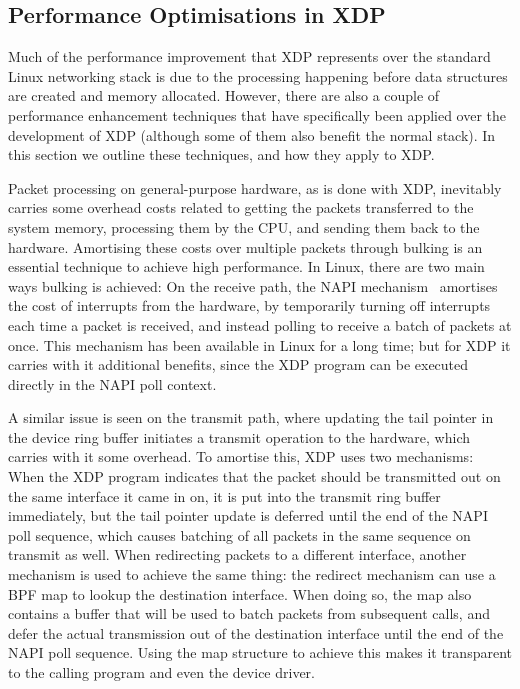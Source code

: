 \documentclass[10pt,sigconf]{acmart}
\begin{document}
\subsection{Performance Optimisations in XDP}
\label{sec:perf-optim-xdp}

Much of the performance improvement that XDP represents over the standard Linux
networking stack is due to the processing happening before data structures are
created and memory allocated. However, there are also a couple of performance
enhancement techniques that have specifically been applied over the development
of XDP (although some of them also benefit the normal stack). In this section we
outline these techniques, and how they apply to XDP.

Packet processing on general-purpose hardware, as is done with XDP, inevitably
carries some overhead costs related to getting the packets transferred to the
system memory, processing them by the CPU, and sending them back to the
hardware. Amortising these costs over multiple packets through bulking is an
essential technique to achieve high performance. In Linux, there are two main
ways bulking is achieved: On the receive path, the NAPI mechanism~\cite{napi}
amortises the cost of interrupts from the hardware, by temporarily turning off
interrupts each time a packet is received, and instead polling to receive a
batch of packets at once. This mechanism has been available in Linux for a long
time; but for XDP it carries with it additional benefits, since the XDP program
can be executed directly in the NAPI poll context.

A similar issue is seen on the transmit path, where updating the tail pointer in
the device ring buffer initiates a transmit operation to the hardware, which
carries with it some overhead. To amortise this, XDP uses two mechanisms: When
the XDP program indicates that the packet should be transmitted out on the same
interface it came in on, it is put into the transmit ring buffer immediately,
but the tail pointer update is deferred until the end of the NAPI poll sequence,
which causes batching of all packets in the same sequence on transmit as well.
When redirecting packets to a different interface, another mechanism is used to
achieve the same thing: the redirect mechanism can use a BPF map to lookup the
destination interface. When doing so, the map also contains a buffer that will
be used to batch packets from subsequent calls, and defer the actual
transmission out of the destination interface until the end of the NAPI poll
sequence. Using the map structure to achieve this makes it transparent to the
calling program and even the device driver.
\end{document}
